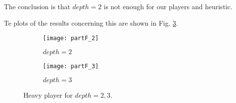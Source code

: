 The conclusion is that $depth=2$ is not enough for our players and heuristic.

Te plots of the results concerning this are shown in Fig. \ref{fig:partF_collettivo}.
\begin{figure}[h]
    \centering
    \begin{subfigure}[b]{0.5\linewidth}
        \texttt{[image: partF\_2]}
        \caption{$depth=2$}
        \label{}
    \end{subfigure}

    \begin{subfigure}[b]{0.5\linewidth}
        \texttt{[image: partF\_3]}
        \caption{$depth=3$}
        \label{}
    \end{subfigure}
    \caption{Heavy player for $depth=2,3$.}
    \label{fig:partF_collettivo}
\end{figure}
